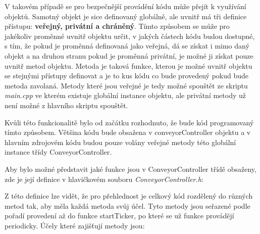 V takovém případě se pro bezpečnější provádění kódu může přejít k využívání objektů. Samotný objekt je sice definovaný globálně, ale uvnitř má tři definice přístupu: \textbf{veřejný, privátní a chráněný}. Tímto způsobem se může pro jakékoliv proměnné uvnitř objektu určit, v jakých částech kódu budou dostupné, s tím, že pokud je proměnná definovaná jako veřejná, dá se získat i mimo daný objekt a na druhou stranu pokud je proměnná privátní, je možné ji získat pouze uvnitř metod objektu. Metoda je taková funkce, kterou je možné uvnitř objektu se stejnými přístupy definovat a je to kus kódu co bude provedený pokud bude metoda zavolaná. Metody které jsou veřejné je tedy možné spouštět ze skriptu \textit{main.cpp} ve kterém existuje globální instance objektu, ale privátní metody už není možné z hlavního skriptu spouštět.

Kvůli této funkcionalitě bylo od začátku rozhodnuto, že bude kód programovaný tímto způsobem. Většina kódu bude obsažena v conveyorController objektu a v hlavním zdrojovém kódu budou pouze volány veřejné metody této globální instance třídy ConveyorController.

Aby bylo možné představit jaké funkce jsou v ConveyorController třídě obsaženy, zde je její definice v hlavičkovém souboru \textit{ConveyorController.h}:



Z této definice lze vidět, že pro přehlednost je celkový kód rozdělený do různých metod tak, aby měla každá metoda svůj účel. Tyto metody jsou seřazené podle pořadí provedení až do funkce startTicker, po které se už funkce provádějí periodicky. Účely které zajišťují metody jsou:

